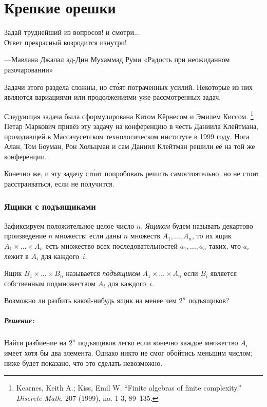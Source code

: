 \chapter*{Крепкие орешки}

\epigraph{Задай  труднейший  из  вопросов!  и  смотри...\\
Ответ  прекрасный  возродится  изнутри!}{---Мавлана Джалал ад-Дин Мухаммад Руми «Радость   при   неожиданном разочаровании»
}

Задачи этого раздела сложны, но ст\'{о}ят потраченных усилий.
Некоторые из них являются вариациями или продолжениями уже рассмотренных задач.

\medskip

Следующая задача была сформулирована
Китом Кёрнесом %
и Эмилем Киссом.%
\footnote{Kearnes, Keith A.; Kiss, Emil W. ``Finite algebras of finite complexity.'' \emph{Discrete Math.} 207 (1999), no. 1-3, 89–135.}
Петар Маркович привёз эту задачу на конференцию в честь Даниила Клейтмана, проходивщей в Массачусетском технологическом институте в 1999 году.
Нога Алан, Том Боуман, Рон Хольцман и сам Даниил Клейтман решили её на той же конференции.

Конечно же, и эту задачу ст\'{о}ит попробовать решить самостоятельно, но не стоит расстраиваться, если не получится.

\subsection*{Ящики с подъящиками}

Зафиксируем положительное целое число $n$.
\emph{Ящиком} будем называть декартово произведение $n$ множеств;
если даны $n$ множеств $A_1,\dots,A_n$, то их ящик $A_1{\times}\dots{\times}A_n$ есть множество всех последовательностей $a_1,\dots,a_n$ таких,
что $a_i$ лежит в $A_i$ для каждого~$i$.

Ящик $B_1{\times}\dots{\times}B_n$ называется \emph{подъящиком} $A_1{\times}\dots{\times}A_n$ если $B_i$ является собственным подмножеством $A_i$ для каждого~$i$. %

Возможно ли разбить какой-нибудь ящик на менее чем $2^n$ подъящиков?

\paragraph{Решение:} Найти разбиение на $2^n$ подъящиков легко если конечно каждое множество $A_i$ имеет хотя бы два элемента.
Однако никто не смог обойтись меньшим числом; ниже будет показано, что это сделать невозможно.

